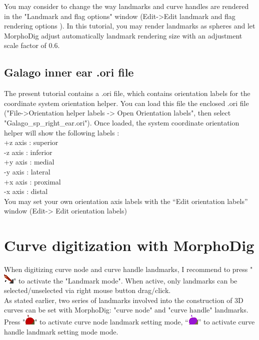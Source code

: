 \documentclass[12pt, a4paper]{book}
\begin{document}
You may consider to change the way landmarks and curve handles are rendered in the "Landmark and flag options" window (Edit->Edit landmark and flag rendering options ). In this tutorial, you may render landmarks as spheres and let MorphoDig adjust automatically landmark rendering size with an adjustment scale factor of 0.6.\\

\subsection{Galago inner ear .ori file}
The present tutorial contains a .ori file, which contains orientation labels for the coordinate system
orientation helper. You can load this file the enclosed .ori file ("File->Orientation helper labels -> Open Orientation labels", then select
"Galago\_sp\_right\_ear.ori"). Once loaded, the system coordinate orientation helper will show the following
labels :\\
+z axis : superior\\
-z axis : inferior\\
+y axis : medial\\
-y axis : lateral\\
+x axis : proximal\\
-x axis : distal\\
You may set your own orientation axis labels with the “Edit orientation labels” window (Edit-> Edit orientation labels)

\section{Curve digitization with MorphoDig}


When digitizing curve node and curve handle landmarks, I recommend to press "\includegraphics[scale=0.7]{../images/04/Landmarks2.png}" to activate the "Landmark mode". When active, only landmarks can be selected/unselected via right mouse button drag/click. \\

As stated earlier, two series of landmarks involved into the construction of 3D curves can be set with MorphoDig: "curve node" and "curve handle" landmarks.
Press "\includegraphics[scale=0.7]{../images/04/curve_nodes.png}" to activate curve node landmark setting mode, “\includegraphics[scale=0.7]{../images/04/curve_handles.png}” to activate curve handle landmark setting mode mode.\\
\end{document}

